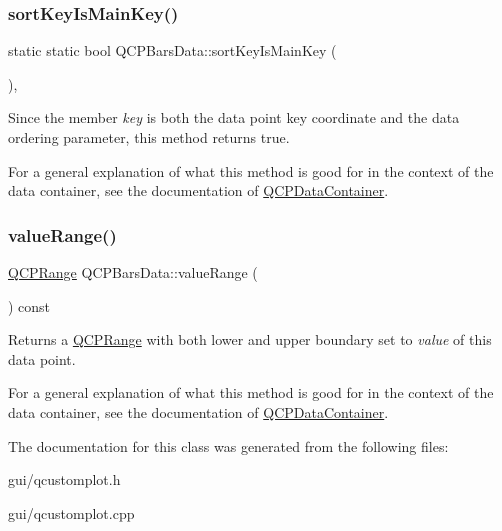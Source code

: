 \subsubsection{\texorpdfstring{sort\+Key\+Is\+Main\+Key()}{sortKeyIsMainKey()}}
{\footnotesize\ttfamily static static bool Q\+C\+P\+Bars\+Data\+::sort\+Key\+Is\+Main\+Key (\begin{DoxyParamCaption}{ }\end{DoxyParamCaption})\hspace{0.3cm}{\ttfamily [inline]}, {\ttfamily [static]}}

Since the member {\itshape key} is both the data point key coordinate and the data ordering parameter, this method returns true.

For a general explanation of what this method is good for in the context of the data container, see the documentation of \hyperlink{classQCPDataContainer}{Q\+C\+P\+Data\+Container}. \mbox{\label{classQCPBarsData_acf3e6479dacacd6c81eebe7d4cd62185}} 
\subsubsection{\texorpdfstring{value\+Range()}{valueRange()}}
{\footnotesize\ttfamily \hyperlink{classQCPRange}{Q\+C\+P\+Range} Q\+C\+P\+Bars\+Data\+::value\+Range (\begin{DoxyParamCaption}{ }\end{DoxyParamCaption}) const\hspace{0.3cm}{\ttfamily [inline]}}

Returns a \hyperlink{classQCPRange}{Q\+C\+P\+Range} with both lower and upper boundary set to {\itshape value} of this data point.

For a general explanation of what this method is good for in the context of the data container, see the documentation of \hyperlink{classQCPDataContainer}{Q\+C\+P\+Data\+Container}. 

The documentation for this class was generated from the following files\+:\begin{DoxyCompactItemize}
\item 
gui/qcustomplot.\+h\item 
gui/qcustomplot.\+cpp\end{DoxyCompactItemize}
